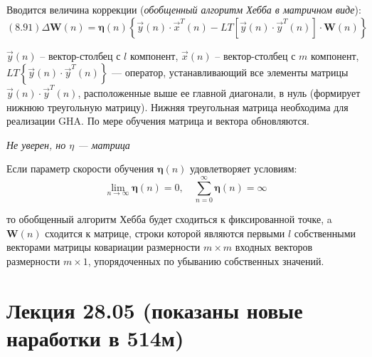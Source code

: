 \documentclass[a4paper]{article}
\numberwithin{equation}{subsection}
\begin{document}
Вводится величина коррекции (\textit{обобщенный алгоритм Хебба в матричном виде}):
\begin{equation}
    (8.91)
    \Delta \mathbf{W}(n) = \mathbf{\eta}(n) 
    \left\{
        \vec{y}(n) \cdot \vec{x}^T(n) - LT
        \left[
            \vec{y}(n) \cdot \vec{y}^T(n)
        \right]
        \cdot \mathbf{W}(n)        
    \right\}
\end{equation}

\noindent
$\vec{y}(n)$ -- вектор-столбец с $l$ компонент, $\vec{x}(n)$ -- вектор-столбец с $m$ компонент,
$LT\left\{ \vec{y}(n) \cdot \vec{y}^T(n) \right\}$ --- оператор, устанавливающий все элементы 
матрицы $\vec{y}(n) \cdot \vec{y}^T(n)$, расположенные выше ее главной диагонали, в нуль
(формирует нижнюю треугольную матрицу).
Нижняя треугольная матрица необходима для реализации GHA. По мере обучения матрица и вектора 
обновляются.

\begin{myquote}
    \textit{Не уверен, но $\eta$ --- матрица}
\end{myquote}

Если параметр скорости обучения $\mathbf{\eta}(n)$ удовлетворяет условиям:
\begin{equation*}
    \lim_{n \to \infty} \mathbf{\eta}(n) = 0, \quad
    \sum_{n=0}^{\infty} \mathbf{\eta}(n) = \infty
\end{equation*}

\noindent
то обобщенный алгоритм Хебба будет сходиться к фиксированной точке, a $\mathbf{W}(n)$ сходится 
к матрице, строки которой являются первыми $l$ собственными векторами матрицы ковариации
размерности $m \times m$ входных векторов размерности $m \times 1$, упорядоченных по убыванию 
собственных значений.




\section{Лекция 28.05 (показаны новые наработки в 514м)}
\end{document}
